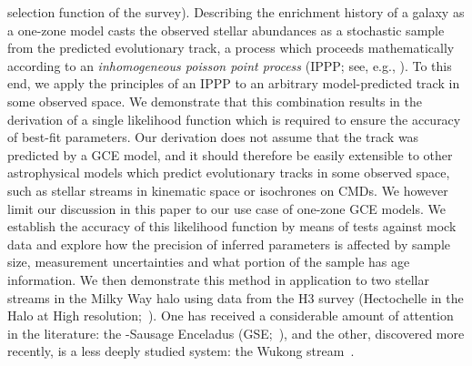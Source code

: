 \documentclass[ms.tex]{subfiles}
\begin{document}
selection function of the survey).
Describing the enrichment history of a galaxy as a one-zone model casts the
observed stellar abundances as a stochastic sample from the predicted
evolutionary track, a process which proceeds mathematically according to an
\textit{inhomogeneous poisson point process} (IPPP; see, e.g.,
\citealt{Press2007}).
To this end, we apply the principles of an IPPP to an arbitrary model-predicted
track in some observed space.
We demonstrate that this combination results in the derivation of a single
likelihood function which is required to ensure the accuracy of best-fit
parameters.
Our derivation does not assume that the track was predicted by a GCE model,
and it should therefore be easily extensible to other astrophysical models
which predict evolutionary tracks in some observed space, such as stellar
streams in kinematic space or isochrones on CMDs.
We however limit our discussion in this paper to our use case of one-zone GCE
models.
We establish the accuracy of this likelihood function by means of tests
against mock data and explore how the precision of inferred parameters is
affected by sample size, measurement uncertainties and what portion of the
sample has age information.
We then demonstrate this method in application to two stellar streams in the
Milky Way halo using data from the H3 survey (Hectochelle in the Halo at High
resolution;~\citealp{Conroy2019}).
One has received a considerable amount of attention in the literature: the
\gaia-Sausage Enceladus (GSE;~\citealp{Belokurov2018, Helmi2018}), and the
other, discovered more recently, is a less deeply studied system: the Wukong
stream~\citep{Naidu2020, Naidu2022}.
\end{document}
